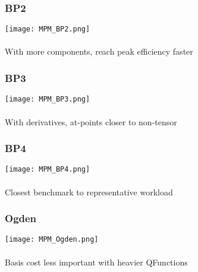 \documentclass{beamer}
\begin{document}
\begin{frame}
\begin{center}
\frametitle{BP2}

\texttt{[image: MPM\_BP2.png]}\\

~\\

With more components, reach peak efficiency faster

\end{center}
\end{frame}


\begin{frame}
\begin{center}
\frametitle{BP3}

\texttt{[image: MPM\_BP3.png]}\\

~\\

With derivatives, at-points closer to non-tensor

\end{center}
\end{frame}


\begin{frame}
\begin{center}
\frametitle{BP4}

\texttt{[image: MPM\_BP4.png]}\\

~\\

Closest benchmark to representative workload

\end{center}
\end{frame}


\begin{frame}
\begin{center}
\frametitle{Ogden}

\texttt{[image: MPM\_Ogden.png]}\\

~\\

Basis cost less important with heavier QFunctions

\end{center}
\end{frame}
\end{document}
